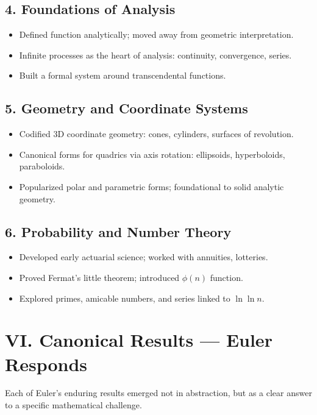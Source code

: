 \documentclass[9pt]{article}
\begin{document}
\subsection*{4. Foundations of Analysis}
\begin{itemize}
  \item Defined function analytically; moved away from geometric interpretation.
  \item Infinite processes as the heart of analysis: continuity, convergence, series.
  \item Built a formal system around transcendental functions.
\end{itemize}

\subsection*{5. Geometry and Coordinate Systems}
\begin{itemize}
  \item Codified 3D coordinate geometry: cones, cylinders, surfaces of revolution.
  \item Canonical forms for quadrics via axis rotation: ellipsoids, hyperboloids, paraboloids.
  \item Popularized polar and parametric forms; foundational to solid analytic geometry.
\end{itemize}

\subsection*{6. Probability and Number Theory}
\begin{itemize}
  \item Developed early actuarial science; worked with annuities, lotteries.
  \item Proved Fermat's little theorem; introduced $\phi(n)$ function.
  \item Explored primes, amicable numbers, and series linked to $\ln \ln n$.
\end{itemize}

\newpage

\section*{VI. Canonical Results — Euler Responds}
Each of Euler's enduring results emerged not in abstraction, but as a clear answer to a specific mathematical challenge.

\vspace{1em}
\end{document}
